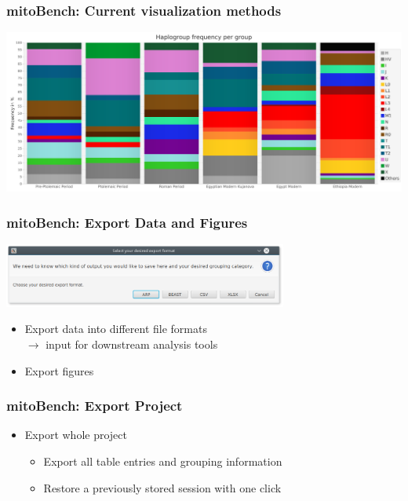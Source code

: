 \documentclass{beamer} %
\begin{document}
\begin{frame}
\frametitle{mitoBench: Current visualization methods}
\begin{center}
	\includegraphics[width=\textwidth]{imagesBench/stackedBarchart.png}
	\end{center}
\end{frame}




%


\begin{frame}
\frametitle{mitoBench: Export Data and Figures}
\begin{center}
	\includegraphics[width=0.7\textwidth]{imagesBench/exportData.png}
\end{center}

\begin{itemize}
	\item Export data into different file formats \\ 
    $\rightarrow$ input for downstream analysis tools
    \item Export figures 
\end{itemize}
\end{frame}


\begin{frame}
\frametitle{mitoBench: Export Project}
\begin{itemize}
\item Export whole project
	\begin{itemize}
		\item Export all table entries and grouping information \pause
        \item Restore a previously stored session with one click
	\end{itemize}
\end{itemize}
\end{frame}
\end{document}
